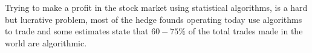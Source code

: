 Trying to make a profit in the stock market using statistical algorithms, is a hard but lucrative problem, most of the hedge founds operating today use algorithms to trade and some estimates state that $60-75\%$ of the total trades made in the world are algorithmic. 
